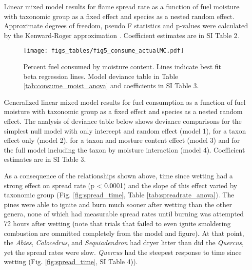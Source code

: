 \documentclass[fire,article,submit,moreauthors,pdftex]{Definitions/mdpi}
\begin{document}
\begin{table}[H]
  \caption{Linear mixed model results for flame spread rate as a function of fuel moisture with taxonomic group as a fixed effect and species as a nested random effect. Approximate degrees of freedom, pseudo F statistics and p-values were calculated by the Kenward-Roger approximation \cite{Kenward_Roger-1997}. Coefficient estimates are in SI Table 2.}
  \label{tab:spreadrate_anova}
\centering

\end{table}



\begin{figure}[H]
  \centering
\texttt{[image: figs\_tables/fig5\_consume\_actualMC.pdf]}
\caption{Percent fuel consumed by moisture content. Lines indicate best fit beta regression lines. Model deviance table in Table \ref{tab:consume_moist_anova} and coefficients in SI Table 3.}
  \label{fig:consume_moist}
\end{figure}


\begin{table}[H]
  \caption{Generalized linear mixed model results for fuel consumption as a function of fuel moisture with taxonomic group as a fixed effect and species as a nested random effect.  The analysis of deviance table below shows deviance comparisons for the simplest null model with only intercept and random effect (model 1), for a taxon effect only (model 2), for a taxon and mosture content effect (model 3) and for the full model including the taxon by moisture interaction (model 4). Coefficient estimates are in SI Table 3.}
  \label{tab:consume_moist_anova}
\centering

\end{table}



As a consequence of the relationships shown above, time since wetting had a strong effect on spread rate (p < 0.0001) and the slope of this effect varied by taxonomic group (Fig. \ref{fig:spread_time}, Table \ref{tab:spreadrate_anova}). The pines were able to ignite and burn much sooner after wetting than the other genera, none of which had measurable spread rates until burning was attempted 72 hours after wetting (note that trials that failed to even ignite smoldering combustion are ommitted completely from the model and figure). At that point, the \emph{Abies}, \emph{Calocedrus}, and \emph{Sequiadendron} had dryer litter than did the \emph{Quercus}, yet the spread rates were slow. \emph{Quercus} had the steepest response to time since wetting (Fig. \ref{fig:spread_time}, SI Table 4)).
\end{document}
